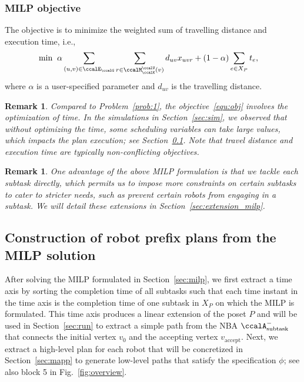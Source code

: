 \documentclass[Afour,sageh,times]{sagej}
\newtheorem{rem}[thm]{Remark}
\newcommand{\auto}[1]{\ccalA_{\textup{#1}}}
\begin{document}
{{{\subsubsection{MILP objective}The objective is to minimize the weighted sum of travelling distance and execution time, i.e.,
\begingroup\makeatletter\def\f@size{10}\check@mathfonts
\def\maketag@@@#1{\hbox{\m@th\normalsize\normalfont#1}}%
\begin{align}\label{equ:obj}
  \min \; \;&  \alpha \sum_{(u,v)\in \ccalE_\ccalG}  \sum_{r \in \ccalM^\ccalV_{\ccalK}(v)} d_{uv} x_{uvr} +  (1 - \alpha) \sum_{e\in X_P} t_e,
\end{align}
 \endgroup
  where $\alpha$ is a user-specified parameter and  $d_{uv}$ is the travelling distance.
  \begin{rem}
   Compared to Problem~\ref{prob:1}, the objective~\eqref{equ:obj} involves the optimization of time. In the simulations in Section~\ref{sec:sim}, we observed that without optimizing the time, some scheduling variables can take large values, which impacts the plan execution; see Section~\ref{sec:path}. Note that travel distance and execution time are typically non-conflicting objectives.
  \end{rem}
  \begin{rem}
    One advantage of the above MILP formulation is that we tackle each subtask directly,  which permits us to impose more constraints on certain subtasks to cater to stricter needs, such as prevent certain robots from engaging in a subtask. We will detail these extensions in Section~\ref{sec:extension_milp}.
  \end{rem}

\subsection{Construction of robot prefix plans from the MILP solution}\label{sec:path}
After solving the MILP formulated in Section~\ref{sec:milp}, we first extract a time axis by sorting the completion time of all subtasks such that each time instant in the time axis is the completion time of one subtask in $X_P$ on which the MILP is formulated. This time axis produces a linear extension of the poset $P$ and  will be used in Section~\ref{sec:run} to extract a simple path from the NBA $\auto{subtask}^-$ that connects the initial vertex $v_0$ and the accepting vertex $v_\text{accept}$. Next, we extract a high-level plan for each robot  that will be concretized in Section~\ref{sec:mapp} to generate low-level paths that satisfy the specification $\phi$; see also block 5 in Fig.~\ref{fig:overview}.


}}}
\end{document}
